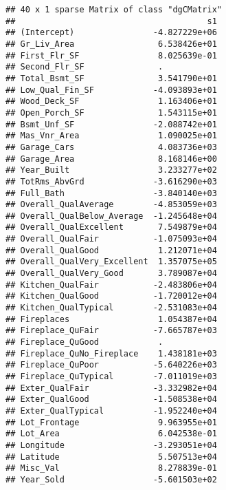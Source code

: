 \documentclass[
]{article}
\newenvironment{Shaded}{\begin{snugshade}}{\end{snugshade}}
\newcommand{\AttributeTok}[1]{\textcolor[rgb]{0.13,0.29,0.53}{#1}}
\newcommand{\FunctionTok}[1]{\textcolor[rgb]{0.13,0.29,0.53}{\textbf{#1}}}
\newcommand{\NormalTok}[1]{#1}
\newcommand{\OtherTok}[1]{\textcolor[rgb]{0.56,0.35,0.01}{#1}}
\newcommand{\SpecialCharTok}[1]{\textcolor[rgb]{0.81,0.36,0.00}{\textbf{#1}}}
\newcommand{\StringTok}[1]{\textcolor[rgb]{0.31,0.60,0.02}{#1}}
\begin{document}
\begin{Shaded}
\end{Shaded}

\begin{verbatim}
## 40 x 1 sparse Matrix of class "dgCMatrix"
##                                       s1
## (Intercept)                -4.827229e+06
## Gr_Liv_Area                 6.538426e+01
## First_Flr_SF                8.025639e-01
## Second_Flr_SF               .           
## Total_Bsmt_SF               3.541790e+01
## Low_Qual_Fin_SF            -4.093893e+01
## Wood_Deck_SF                1.163406e+01
## Open_Porch_SF               1.543115e+01
## Bsmt_Unf_SF                -2.088742e+01
## Mas_Vnr_Area                1.090025e+01
## Garage_Cars                 4.083736e+03
## Garage_Area                 8.168146e+00
## Year_Built                  3.233277e+02
## TotRms_AbvGrd              -3.616290e+03
## Full_Bath                  -3.840140e+03
## Overall_QualAverage        -4.853059e+03
## Overall_QualBelow_Average  -1.245648e+04
## Overall_QualExcellent       7.549879e+04
## Overall_QualFair           -1.075093e+04
## Overall_QualGood            1.212071e+04
## Overall_QualVery_Excellent  1.357075e+05
## Overall_QualVery_Good       3.789087e+04
## Kitchen_QualFair           -2.483806e+04
## Kitchen_QualGood           -1.720012e+04
## Kitchen_QualTypical        -2.531083e+04
## Fireplaces                  1.054387e+04
## Fireplace_QuFair           -7.665787e+03
## Fireplace_QuGood            .           
## Fireplace_QuNo_Fireplace    1.438181e+03
## Fireplace_QuPoor           -5.640226e+03
## Fireplace_QuTypical        -7.011019e+03
## Exter_QualFair             -3.332982e+04
## Exter_QualGood             -1.508538e+04
## Exter_QualTypical          -1.952240e+04
## Lot_Frontage                9.963955e+01
## Lot_Area                    6.042538e-01
## Longitude                  -3.293051e+04
## Latitude                    5.507513e+04
## Misc_Val                    8.278839e-01
## Year_Sold                  -5.601503e+02
\end{verbatim}
\end{document}
